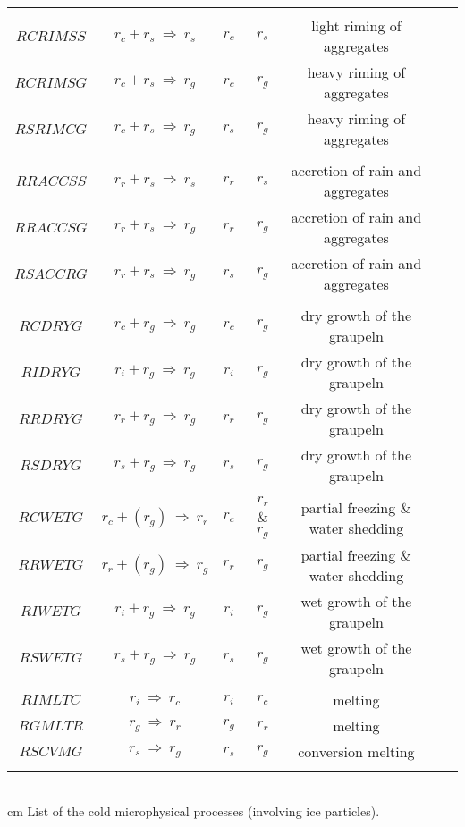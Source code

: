 \begin{center}
\begin{tabular}{|c|c|c|c|c|c|c|}
 & & & & \\
$RCRIMSS$ & $r_c+r_s\ \Longrightarrow \ r_s$ & $r_c$ & $r_s$ & light riming of aggregates \\
$RCRIMSG$ & $r_c+r_s\ \Longrightarrow \ r_g$ & $r_c$ & $r_g$ & heavy riming of aggregates \\
$RSRIMCG$ & $r_c+r_s\ \Longrightarrow \ r_g$ & $r_s$ & $r_g$ & heavy riming of aggregates \\
 & & & & \\
$RRACCSS$ & $r_r+r_s\ \Longrightarrow \ r_s$ & $r_r$ & $r_s$ & accretion of rain and aggregates \\
$RRACCSG$ & $r_r+r_s\ \Longrightarrow \ r_g$ & $r_r$ & $r_g$ & accretion of rain and aggregates \\
$RSACCRG$ & $r_r+r_s\ \Longrightarrow \ r_g$ & $r_s$ & $r_g$ & accretion of rain and aggregates \\
 & & & & \\
$RCDRYG$ & $r_c+r_g\ \Longrightarrow \ r_g$ & $r_c$ & $r_g$ & dry growth of the graupeln \\
$RIDRYG$ & $r_i+r_g\ \Longrightarrow \ r_g$ & $r_i$ & $r_g$ & dry growth of the graupeln \\
$RRDRYG$ & $r_r+r_g\ \Longrightarrow \ r_g$ & $r_r$ & $r_g$ & dry growth of the graupeln \\
$RSDRYG$ & $r_s+r_g\ \Longrightarrow \ r_g$ & $r_s$ & $r_g$ & dry growth of the graupeln \\
 & & & & \\
$RCWETG$ & $r_c+(r_g)\ \Longrightarrow \ r_r$ & $r_c$ & $r_r$ \& $r_g$ & partial freezing \& water shedding \\
$RRWETG$ & $r_r+(r_g)\ \Longrightarrow \ r_g$ & $r_r$ & $r_g$ & partial freezing
\& water shedding \\
$RIWETG$ & $r_i+r_g\ \Longrightarrow \ r_g$ & $r_i$ & $r_g$ & wet growth of the graupeln \\
$RSWETG$ & $r_s+r_g\ \Longrightarrow \ r_g$ & $r_s$ & $r_g$ & wet growth of the graupeln \\
 & & & & \\
$RIMLTC$ & $r_i\ \Longrightarrow \ r_c$ & $r_i$ & $r_c$ & melting \\
$RGMLTR$ & $r_g\ \Longrightarrow \ r_r$ & $r_g$ & $r_r$ & melting \\
$RSCVMG$ & $r_s\ \Longrightarrow \ r_g$ & $r_s$ & $r_g$ & conversion melting \\
 & & & & \\
\hline
\end{tabular}
\\
 cm
List of the cold microphysical processes (involving ice particles).
\end{center}

